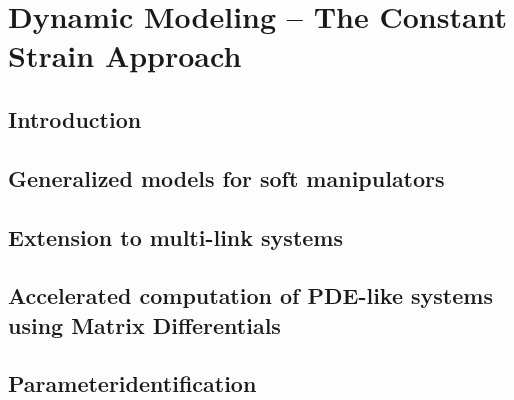 \chapter[Dynamic modeling of Soft Robots -- PCC case]{Dynamic Modeling -- The  Constant Strain Approach}
\label{chap: chapter 1}




\ifx\printChapterOne\undefined
\else

\section{Introduction}
\label{sec: chap1 1_introduction}


\cleardoublepage
\section{Generalized models for soft manipulators}
\label{sec: chap2 section header}


\section{Extension to multi-link systems}
\label{sec: chap2 section header}


\clearpage
\section[Accelerated computation of PDE-like systems]{Accelerated computation of PDE-like systems using Matrix Differentials}
\label{sec: chap2 section header}


\clearpage
\section{\editl Parameter\editr identification}
\label{sec: chap2 section header}


